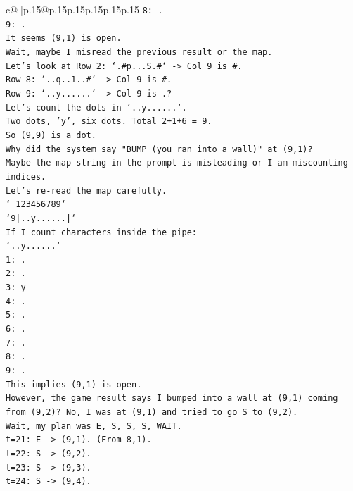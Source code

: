 \documentclass{article}
\begin{document}
{\begin{supertabular}{c@{$\;$}|p{.15\linewidth}@{}p{.15\linewidth}p{.15\linewidth}p{.15\linewidth}p{.15\linewidth}p{.15\linewidth}}
{{{\texttt{8: .} \\
\texttt{9: .} \\
\texttt{It seems (9,1) is open.} \\
\texttt{Wait, maybe I misread the previous result or the map.} \\
\texttt{Let's look at Row 2: `.\#p...S.\#` {-}> Col 9 is \#.} \\
\texttt{Row 8: `..q..1..\#` {-}> Col 9 is \#.} \\
\texttt{Row 9: `..y......` {-}> Col 9 is .?} \\
\texttt{Let's count the dots in `..y......`.} \\
\texttt{Two dots, 'y', six dots. Total 2+1+6 = 9.} \\
\texttt{So (9,9) is a dot.} \\
\texttt{Why did the system say "BUMP (you ran into a wall)" at (9,1)?} \\
\texttt{Maybe the map string in the prompt is misleading or I am miscounting indices.} \\
\texttt{Let's re{-}read the map carefully.} \\
\texttt{` 123456789`} \\
\texttt{`9|..y......|`} \\
\texttt{If I count characters inside the pipe:} \\
\texttt{`..y......`} \\
\texttt{1: .} \\
\texttt{2: .} \\
\texttt{3: y} \\
\texttt{4: .} \\
\texttt{5: .} \\
\texttt{6: .} \\
\texttt{7: .} \\
\texttt{8: .} \\
\texttt{9: .} \\
\texttt{This implies (9,1) is open.} \\
\texttt{However, the game result says I bumped into a wall at (9,1) coming from (9,2)? No, I was at (9,1) and tried to go S to (9,2).} \\
\texttt{Wait, my plan was E, S, S, S, WAIT.} \\
\texttt{t=21: E {-}> (9,1). (From 8,1).} \\
\texttt{t=22: S {-}> (9,2).} \\
\texttt{t=23: S {-}> (9,3).} \\
\texttt{t=24: S {-}> (9,4).} \\
}}}
\end{supertabular}}
\end{document}
